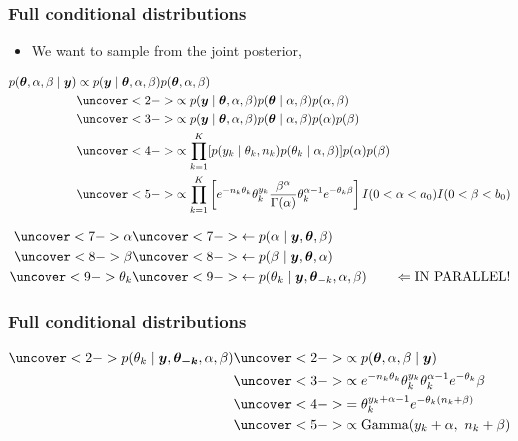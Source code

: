 \documentclass[handout]{beamer}
\providecommand{\vc}[1]{\boldsymbol{#1}}
\numberwithin{equation}{section}
\begin{document}
\begin{frame}
\frametitle{Full conditional distributions} \scriptsize
\begin{itemize}
\item We want to sample from the joint posterior,
\end{itemize}

\begin{align*}
p(\vc{\theta}, \alpha, \beta \mid \vc{y}) &\propto p(\vc{y} \mid \vc{\theta}, \alpha, \beta) p(\vc{\theta}, \alpha, \beta) \\
&\uncover<2->{\propto p(\vc{y} \mid \vc{\theta}, \alpha, \beta) p(\vc{\theta} \mid \alpha, \beta) p(\alpha, \beta)} \\
&\uncover<3->{\propto p(\vc{y} \mid \vc{\theta}, \alpha, \beta) p(\vc{\theta} \mid \alpha, \beta) p(\alpha)p(\beta)} \\
&\uncover<4->{\propto \prod_{k = 1}^K [p(y_k \mid \theta_k, n_k) p(\theta_k \mid \alpha, \beta)] p(\alpha) p(\beta)} \\
&\uncover<5->{\propto \prod_{k = 1}^K \left [e^{-n_k \theta_k} \theta_k^{y_k} \frac{\beta^\alpha}{\Gamma(\alpha)} \theta_k^{\alpha - 1} e^{-\theta_k \beta}\right ] I(0 < \alpha < a_0) I(0 < \beta < b_0) }
\end{align*}
\begin{itemize}
\end{itemize}
\begin{align*}
\uncover<7->{\alpha} &\uncover<7->{\leftarrow p(\alpha \mid \vc{y}, \vc{\theta}, \beta)}  \\
\uncover<8->{\beta} &\uncover<8->{\leftarrow p(\beta \mid \vc{y}, \vc{\theta}, \alpha)} \\
\uncover<9->{\theta_k} &\uncover<9->{\leftarrow p(\theta_k \mid \vc{y}, \vc{\theta}_{-k}, \alpha, \beta) \qquad \Leftarrow \text{IN PARALLEL!}} 
\end{align*}


\end{frame}



\begin{frame}
\frametitle{Full conditional distributions}

\begin{align*}
\uncover<2->{p(\theta_k \mid \vc{y}, \vc{\theta_{-k}}, \alpha, \beta)} & \uncover<2->{\propto p(\vc{\theta}, \alpha, \beta \mid \vc{y})} \\
&\uncover<3->{\propto e^{-n_k \theta_k} \theta_k^{y_k} \theta_k^{\alpha - 1} e^{- \theta_k} \beta} \\
&\uncover<4->{= \theta_k^{y_k + \alpha - 1} e^{-\theta_k(n_k + \beta)}} \\
&\uncover<5->{\propto \text{Gamma}(y_k + \alpha, \ n_k + \beta)}
\end{align*}




\end{frame}
\end{document}
